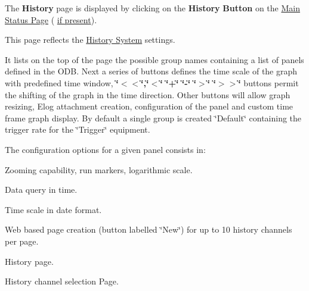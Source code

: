 \par
 The {\bfseries History} page is displayed by clicking on the {\bfseries History} {\bfseries Button} on the \hyperlink{RC_mhttpd_Main_Status_page}{Main Status Page} ( \hyperlink{RC_mhttpd_status_page_features_RC_mhttpd_status_menu_buttons}{if present}).

This page reflects the \hyperlink{F_History_logging}{History System} settings.

It lists on the top of the page the possible group names containing a list of panels defined in the ODB. Next a series of buttons defines the time scale of the graph with predefined time window, {\bfseries  \char`\"{}$<$$<$\char`\"{},\char`\"{}$<$\char`\"{} \char`\"{}+\char`\"{} \char`\"{}-\/\char`\"{} \char`\"{}$>$\char`\"{} \char`\"{}$>$$>$\char`\"{} } buttons permit the shifting of the graph in the time direction. Other buttons will allow graph resizing, Elog attachment creation, configuration of the panel and custom time frame graph display. By default a single group is created \char`\"{}Default\char`\"{} containing the trigger rate for the \char`\"{}Trigger\char`\"{} equipment.

The configuration options for a given panel consists in:
\begin{DoxyItemize}
\item Zooming capability, run markers, logarithmic scale.
\item Data query in time.
\item Time scale in date format.
\item Web based page creation (button labelled \char`\"{}New\char`\"{}) for up to 10 history channels per page.
\end{DoxyItemize}

\par
\par
\par
 \begin{center}  History page. \par
\par
\par
  \end{center}  \par
\par
\par


\par
\par
\par
 \begin{center}  History channel selection Page. \par
\par
\par
  \end{center}  \par
\par
\par



